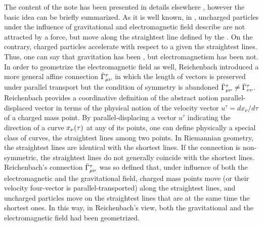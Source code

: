 \documentclass[draft]{article}
\newcommand{\ap}{\ensuremath{\tau}\xspace}
\newcommand{\dap}{\ensuremath{d\ap}\xspace}
\newcommand{\Gtmnbar}{\ensuremath{\bar{\Gamma}\tmn}\xspace}
\begin{document}
The content of the note has been presented in details elsewhere \citep{Giovanelli2016}, however the basic idea can be briefly summarized. As it is well known, in \gr, uncharged particles under the influence of gravitational and electromagnetic field describe are not attracted by a force, but move along the straightest line defined by the \Gtmn. On the contrary, charged particles accelerate with respect to a given the straightest lines. Thus, one can say that gravitation has been , but electromagnetism has been not. In order to geometrize the electromagnetic field as well, Reichenbach introduced a more general affine connection \Gtmnbar in which the length of vectors is preserved under parallel transport but the condition of symmetry is abandoned $\Gtmnbar \neq \bar{\Gamma}^\tau_{\nu\nu}$. Reichenbach provides a coordinative definition of the abstract notion parallel-displaced vector in terms of the physical notion of the velocity vector $u^\tau=dx_\nu/\dap$ of a charged mass point. By parallel-displacing a vector $u^\tau$ indicating the direction of a curve $\xn(\ap)$ at any of its points, one can define physically a special class of curves, the straightest lines among two points. In Riemannian geometry, the straightest lines are identical with the shortest lines. If the connection is non-symmetric, the straightest lines do not generally coincide with the shortest lines. Reichenbach's connection \Gtmnbar was so defined that, under influence of both the electromagnetic and the gravitational field, charged mass points move (or their velocity four-vector is parallel-transported) along the straightest lines, and uncharged particles move on the straightest lines that are at the same time the shortest ones. In this way, in Reichenbach's view, both the gravitational and the electromagnetic field had been geometrized.

\end{document}

